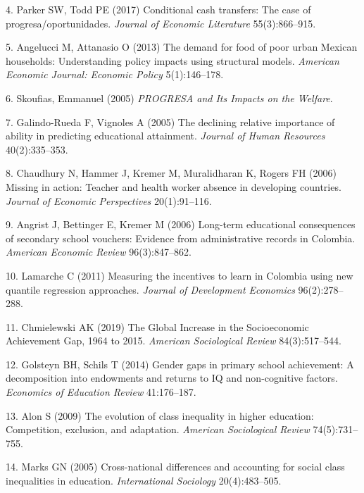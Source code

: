 \documentclass[9pt,twocolumn,twoside,]{pnas-new}
\begin{document}
\leavevmode\hypertarget{ref-Parker2017}{}%
4. Parker SW, Todd PE (2017) Conditional cash transfers: The case of
progresa/oportunidades. \emph{Journal of Economic Literature}
55(3):866--915.

\leavevmode\hypertarget{ref-Angelucci2013}{}%
5. Angelucci M, Attanasio O (2013) The demand for food of poor urban
Mexican households: Understanding policy impacts using structural
models. \emph{American Economic Journal: Economic Policy} 5(1):146--178.

\leavevmode\hypertarget{ref-Skoufias2005}{}%
6. Skoufias, Emmanuel (2005) \emph{PROGRESA and Its Impacts on the
Welfare}.

\leavevmode\hypertarget{ref-Galindo-Rueda2005}{}%
7. Galindo-Rueda F, Vignoles A (2005) The declining relative importance
of ability in predicting educational attainment. \emph{Journal of Human
Resources} 40(2):335--353.

\leavevmode\hypertarget{ref-Chaudhury2006}{}%
8. Chaudhury N, Hammer J, Kremer M, Muralidharan K, Rogers FH (2006)
Missing in action: Teacher and health worker absence in developing
countries. \emph{Journal of Economic Perspectives} 20(1):91--116.

\leavevmode\hypertarget{ref-Angrist2006}{}%
9. Angrist J, Bettinger E, Kremer M (2006) Long-term educational
consequences of secondary school vouchers: Evidence from administrative
records in Colombia. \emph{American Economic Review} 96(3):847--862.

\leavevmode\hypertarget{ref-Lamarche2011}{}%
10. Lamarche C (2011) Measuring the incentives to learn in Colombia
using new quantile regression approaches. \emph{Journal of Development
Economics} 96(2):278--288.

\leavevmode\hypertarget{ref-Chmielewski2019}{}%
11. Chmielewski AK (2019) The Global Increase in the Socioeconomic
Achievement Gap, 1964 to 2015. \emph{American Sociological Review}
84(3):517--544.

\leavevmode\hypertarget{ref-Golsteyn2014}{}%
12. Golsteyn BH, Schils T (2014) Gender gaps in primary school
achievement: A decomposition into endowments and returns to IQ and
non-cognitive factors. \emph{Economics of Education Review} 41:176--187.

\leavevmode\hypertarget{ref-Alon2009}{}%
13. Alon S (2009) The evolution of class inequality in higher education:
Competition, exclusion, and adaptation. \emph{American Sociological
Review} 74(5):731--755.

\leavevmode\hypertarget{ref-Marks2005}{}%
14. Marks GN (2005) Cross-national differences and accounting for social
class inequalities in education. \emph{International Sociology}
20(4):483--505.
\end{document}
